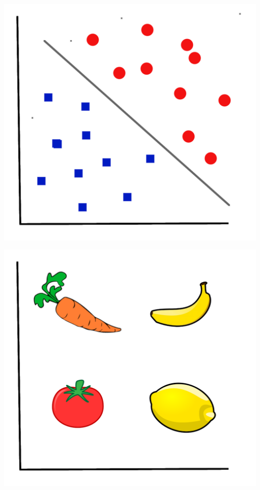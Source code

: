 \documentclass[aspectratio=169,xcolor=dvipsnames]{beamer}
\begin{document}
\begin{frame}
\begin{center}
\includegraphics[height=0.8\paperheight,keepaspectratio]{images/coordinates_points_5} 
\end{center}
\end{frame}

\begin{frame}
\begin{center}
\includegraphics[height=0.8\paperheight,keepaspectratio]{images/coordinates_veggi_empty} 
\end{center}
\end{frame}
\end{document}
